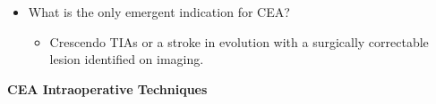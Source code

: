 \documentclass[
]{book}
\providecommand{\tightlist}{%
  \setlength{\itemsep}{0pt}\setlength{\parskip}{0pt}}
\begin{document}
\begin{itemize}
\begin{itemize}
\begin{itemize}
      \begin{itemize}
      \item
        Patient age \textgreater80 and diabetes are contraindications to
        tPA administration after 3hrs.
      \item
        Other contraindications include - hypertension,
        intracranial hemorrhage, recent stroke or cranial
        trauma, spine/brain surgery within 3 months, GI bleed
        within 21 days.
      \end{itemize}
    \item
      \textless6hr from onset of symptoms - catheter directed therapy
    \end{itemize}
  \end{itemize}
\item
  What is the only emergent indication for CEA?

  \begin{itemize}
  \tightlist
  \item
    Crescendo TIAs or a stroke in evolution with a surgically
    correctable lesion identified on imaging.
  \end{itemize}
\end{itemize}

\textbf{CEA Intraoperative Techniques}
\end{document}
